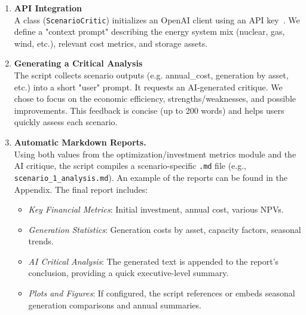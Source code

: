 \begin{enumerate}
    \item \textbf{API Integration} \\
    A class (\lstinline|ScenarioCritic|) initializes an OpenAI client using an API key~\cite{openai_api_docs}. We 
    define a "context prompt" describing the energy system mix (nuclear, gas, wind, etc.), relevant 
    cost metrics, and storage assets. 

    \item \textbf{Generating a Critical Analysis} \\
    The script collects scenario outputs (e.g. annual\_cost, generation by asset, etc.) into 
    a short "user" prompt. It requests an AI-generated critique. We chose to focus on the economic efficiency, 
    strengths/weaknesses, and possible improvements. This feedback is concise (up to 200 words) and helps users 
    quickly assess each scenario.

    \item \textbf{Automatic Markdown Reports.} \\
    Using both values from the optimization/investment metrics module and the AI critique, 
    the script compiles a scenario-specific \texttt{.md} file (e.g., 
    \lstinline|scenario_1_analysis.md|). 
    An example of the reports can be found in the Appendix.
    The final report includes:
    \begin{itemize}
        \item \emph{Key Financial Metrics}: Initial investment, annual cost, various NPVs.
        \item \emph{Generation Statistics}: Generation costs by asset, capacity factors, seasonal trends.
        \item \emph{AI Critical Analysis}: The generated text is appended to the report’s conclusion, 
        providing a quick executive-level summary.
        \item \emph{Plots and Figures}: If configured, the script references or embeds seasonal 
        generation comparisons and annual summaries.
    \end{itemize}
\end{enumerate}

  
